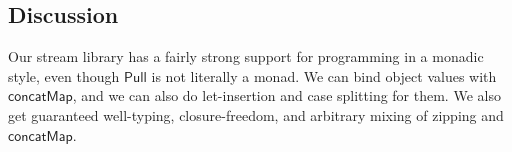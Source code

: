 \documentclass[acmsmall,screen,review,anonymous]{acmart}
\newcommand{\mit}[1]{{\mathsf{#1}}}
\newcommand{\msf}[1]{{\mathsf{#1}}}
\newcommand{\mbf}[1]{{\mathbf{#1}}}
\newcommand{\bs}[1]{\boldsymbol{#1}}
\newcommand{\ind}{\hspace{1em}}
\newcommand{\return}{\mbf{return}\,}
\newcommand{\lam}{\lambda\,}
\newcommand{\M}{\msf{M}}
\newcommand{\vm}{\mathsf{m}}
\newcommand{\vn}{\mathsf{n}}
\newcommand{\vA}{\mathsf{A}}
\newcommand{\va}{\mathsf{a}}
\newcommand{\vb}{\mathsf{b}}
\newcommand{\SOP}{\msf{SOP}}
\newcommand{\forEach}{\msf{forEach}}
\newcommand{\single}{\msf{single}}
\newcommand{\msplit}{\msf{split}}
\newcommand{\Bool}{\msf{Bool}}
\newcommand{\case}{\mbf{case\,}}
\newcommand{\concatMap}{\msf{concatMap}}
\newcommand{\Lift}{{\Uparrow}}
\newcommand{\spl}{{\bs{\sim}}}
\newcommand{\ql}{{\bs{\langle}}}
\newcommand{\qr}{{\bs{\rangle}}}
\newcommand{\True}{\msf{True}}
\newcommand{\False}{\msf{False}}
\theoremstyle{remark}
\newcommand{\gen}{\mit{gen}}
\newcommand{\qt}[1]{\ql#1\qr}
\newcommand{\Stop}{\msf{Stop}}
\newcommand{\Yield}{\msf{Yield}}
\newcommand{\dlr}{\,\$\,}
\newcommand{\Pull}{\msf{Pull}}
\begin{document}

\subsection{Discussion}

Our stream library has a fairly strong support for programming in a monadic
style, even though $\Pull$ is not literally a monad. We can bind object values
with $\concatMap$, and we can also do let-insertion and case splitting for
them. We also get guaranteed well-typing, closure-freedom, and arbitrary mixing
of zipping and $\concatMap$.
\end{document}
